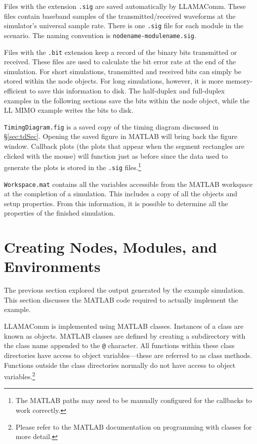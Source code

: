 Files with the extension \verb+.sig+ are saved automatically by
LLAMAComm. These files contain baseband samples of the
transmitted/received waveforms at the simulator's universal sample
rate.  There is one \verb+.sig+ file for each module in the
scenario. The naming convention is \verb+nodename-modulename.sig+.

Files with the \verb+.bit+ extension keep a record of the binary
bits transmitted or received.  These files are used to calculate the
bit error rate at the end of the simulation.  For short simulations,
transmitted and received bits can simply be stored within the node
objects.  For long simulations, however, it is more memory-efficient
to save this information to disk.  The half-duplex and full-duplex
examples in the following sections save the bits within the node
object, while the LL MIMO example writes the bits to disk.

\verb+TimingDiagram.fig+ is a saved copy of the timing diagram
discussed in \S\ref{sec:tdSec}.  Opening the saved figure in MATLAB
will bring back the figure window.  Callback plots (the plots that
appear when the segment rectangles are clicked with the mouse) will
function just as before since the data used to generate the plots is
stored in the \verb+.sig+ files.\footnote{The MATLAB paths may need
to be manually configured for the callbacks to work correctly.}

\verb+Workspace.mat+ contains all the variables accessible from the
MATLAB workspace at the completion of a simulation.  This includes a
copy of all the objects and setup properties.  From this
information, it is possible to determine all the properties of the
finished simulation.

\section{Creating Nodes, Modules, and Environments}
\label{sec:exampleSection}

The previous section explored the output generated by the example
simulation.  This section discusses the MATLAB code required to
actually implement the example.

LLAMAComm is implemented using MATLAB classes.  Instances of a class
are known as objects.  MATLAB classes are defined by creating a
subdirectory with the class name appended to the \verb+@+ character.
All functions within these class directories have access to object
variables---these are referred to as class methods.  Functions
outside the class directories normally do not have access to object
variables.\footnote{Please refer to the MATLAB documentation on
programming with classes for more detail.}

